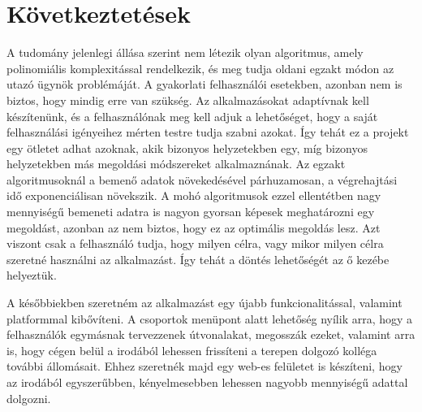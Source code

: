 \chapter{Következtetések}\label{ch:ALAP}

A tudomány jelenlegi állása szerint nem létezik olyan algoritmus, amely polinomiális komplexitással rendelkezik, és meg tudja oldani egzakt módon az utazó ügynök problémáját. A gyakorlati felhasználói esetekben, azonban nem is biztos, hogy mindig erre van szükség. Az alkalmazásokat adaptívnak kell készítenünk, és a felhasználónak meg kell adjuk a lehetőséget, hogy a saját felhasználási igényeihez mérten testre tudja szabni azokat. Így tehát ez a projekt egy ötletet adhat azoknak, akik bizonyos helyzetekben egy, míg bizonyos helyzetekben más megoldási módszereket alkalmaznának. Az egzakt algoritmusoknál a bemenő adatok növekedésével párhuzamosan, a végrehajtási idő exponenciálisan növekszik. A mohó algoritmusok ezzel ellentétben nagy mennyiségű bemeneti adatra is nagyon gyorsan képesek meghatározni egy megoldást, azonban az nem biztos, hogy ez az optimális megoldás lesz. Azt viszont csak a felhasználó tudja, hogy milyen célra, vagy mikor milyen célra szeretné használni az alkalmazást. Így tehát a döntés lehetőségét az ő kezébe helyeztük.

A későbbiekben szeretném az alkalmazást egy újabb funkcionalitással, valamint platformmal kibővíteni. A csoportok menüpont alatt lehetőség nyílik arra, hogy a felhasználók egymásnak tervezzenek útvonalakat, megosszák ezeket, valamint arra is, hogy cégen belül a irodából lehessen frissíteni a terepen dolgozó kolléga további állomásait. Ehhez szeretnék majd egy web-es felületet is készíteni, hogy az irodából egyszerűbben, kényelmesebben lehessen nagyobb mennyiségű adattal dolgozni.\cite{gt_problem}\cite{gt_and_appl}\cite{gt_alg_india}\cite{comp_tsp}
